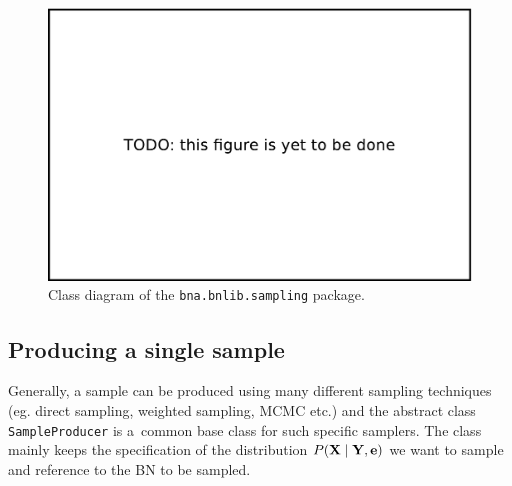 \documentclass[english,cover]{fitthesis} %
\newcommand{\srccode}[1]{{\tt #1}}         %
\newcommand{\vars}[1]{{\bold{#1}}}         %
\begin{document}
\begin{center}
\begin{figure}[h]
    \begin{center}
    \includegraphics[scale=0.4]{fig/todo}
    \end{center}
    \caption{Class diagram of the \srccode{bna.bnlib.sampling} package.}
    \label{fig:sapling_package_class_diagram}
\end{figure}
\end{center}



\subsection{Producing a single sample}
Generally, a sample can be produced using many different sampling techniques (eg. direct sampling, weighted sampling, MCMC etc.) and the abstract class \srccode{SampleProducer} is a~common base class for such specific samplers. The class mainly keeps the specification of the distribution $P(\vars{X} \mid \vars{Y}, \vars{e})$ we want to sample and reference to the BN to be sampled.
\end{document}
